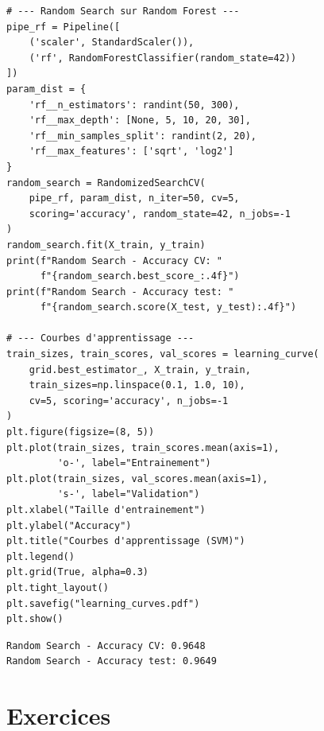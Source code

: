 \begin{codeblock}[title=\textbf{Random Search et courbes d'apprentissage}]
\begin{verbatim}
# --- Random Search sur Random Forest ---
pipe_rf = Pipeline([
    ('scaler', StandardScaler()),
    ('rf', RandomForestClassifier(random_state=42))
])
param_dist = {
    'rf__n_estimators': randint(50, 300),
    'rf__max_depth': [None, 5, 10, 20, 30],
    'rf__min_samples_split': randint(2, 20),
    'rf__max_features': ['sqrt', 'log2']
}
random_search = RandomizedSearchCV(
    pipe_rf, param_dist, n_iter=50, cv=5,
    scoring='accuracy', random_state=42, n_jobs=-1
)
random_search.fit(X_train, y_train)
print(f"Random Search - Accuracy CV: "
      f"{random_search.best_score_:.4f}")
print(f"Random Search - Accuracy test: "
      f"{random_search.score(X_test, y_test):.4f}")

# --- Courbes d'apprentissage ---
train_sizes, train_scores, val_scores = learning_curve(
    grid.best_estimator_, X_train, y_train,
    train_sizes=np.linspace(0.1, 1.0, 10),
    cv=5, scoring='accuracy', n_jobs=-1
)
plt.figure(figsize=(8, 5))
plt.plot(train_sizes, train_scores.mean(axis=1),
         'o-', label="Entrainement")
plt.plot(train_sizes, val_scores.mean(axis=1),
         's-', label="Validation")
plt.xlabel("Taille d'entrainement")
plt.ylabel("Accuracy")
plt.title("Courbes d'apprentissage (SVM)")
plt.legend()
plt.grid(True, alpha=0.3)
plt.tight_layout()
plt.savefig("learning_curves.pdf")
plt.show()
\end{verbatim}
\end{codeblock}

\begin{codeoutput}
\begin{verbatim}
Random Search - Accuracy CV: 0.9648
Random Search - Accuracy test: 0.9649
\end{verbatim}
\end{codeoutput}

\section{Exercices}
\label{sec:exercises-ch11}

